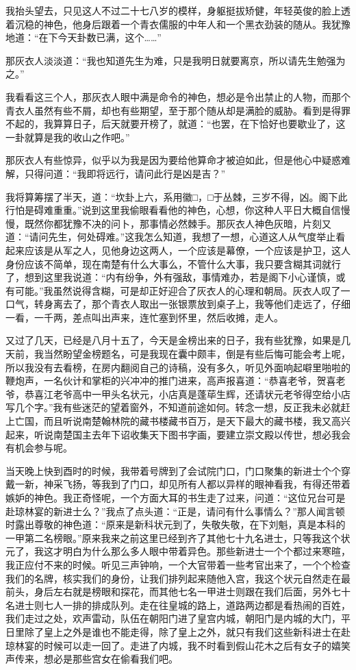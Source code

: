 我抬头望去，只见这人不过二十七八岁的模样，身躯挺拔矫健，年轻英俊的脸上透着沉稳的神色，他身后跟着一个青衣儒服的中年人和一个黑衣劲装的随从。我犹豫地道：“在下今天卦数已满，这个……”

那灰衣人淡淡道：“我也知道先生为难，只是我明日就要离京，所以请先生勉强为之。”

我看看这三个人，那灰衣人眼中满是命令的神色，想必是令出禁止的人物，而那个青衣人虽然有些不屑，却也有些期望，至于那个随从却是满脸的威胁。看到是得罪不起的，我算算日子，后天就要开榜了，就道：“也罢，在下恰好也要歇业了，这一卦就算是我的收山之作吧。”

那灰衣人有些惊异，似乎以为我是因为要给他算命才被迫如此，但是他心中疑惑难解，只得问道：“我即将远行，请问此行是凶是吉？”

我将算筹摆了半天，道：“坎卦上六，系用徽□，□于丛棘，三岁不得，凶。阁下此行怕是碍难重重。”说到这里我偷眼看看他的神色，心想，你这种人平日大概自信慢慢，既然你都犹豫不决的问卜，那事情必然棘手。那灰衣人神色灰暗，片刻又道：“请问先生，何处碍难。”这我怎么知道，我想了一想，心道这人从气度举止看起来应该是从军之人，见他身边这两人，一个应该是幕僚，一个应该是护卫，这人身份应该不简单，现在南楚有什么大事么，不管什么大事，我只要含糊其词就行了，想到这里我说道：“内有纷争，外有强敌，事情难办，若是阁下小心谨慎，或有可能。”我虽然说得含糊，可是却正好迎合了灰衣人的心理和朝局。灰衣人叹了一口气，转身离去了，那个青衣人取出一张银票放到桌子上，我等他们走远了，仔细一看，一千两，差点叫出声来，连忙塞到怀里，然后收摊，走人。

又过了几天，已经是八月十五了，今天是金榜出来的日子，我有些犹豫，如果是几天前，我当然盼望金榜题名，可是我现在囊中颇丰，倒是有些后悔可能会考上呢，所以我没有去看榜，在房内翻阅自己的诗稿，没有多久，听见外面响起噼里啪啦的鞭炮声，一名伙计和掌柜的兴冲冲的推门进来，高声报喜道：“恭喜老爷，贺喜老爷，恭喜江老爷高中一甲头名状元，小店真是蓬荜生辉，还请状元老爷得空给小店写几个字。”我有些迷茫的望着窗外，不知道前途如何。转念一想，反正我未必就赶上亡国，而且听说南楚翰林院的藏书楼藏书百万，是天下最大的藏书楼，我又高兴起来，听说南楚国主去年下诏收集天下图书字画，要建立崇文殿以传世，想必我会有机会参与呢。

当天晚上快到酉时的时候，我带着号牌到了会试院门口，门口聚集的新进士个个穿戴一新，神采飞扬，等我到了门口，却见所有人都以异样的眼神看我，有得还带着嫉妒的神色。我正奇怪呢，一个方面大耳的书生走了过来，问道：“这位兄台可是赴琼林宴的新进士么？”我点了点头道：“正是，请问有什么事情么？”那人闻言顿时露出尊敬的神色道：“原来是新科状元到了，失敬失敬，在下刘魁，真是本科的一甲第二名榜眼。”原来我来之前这里已经到齐了其他七十九名进士，只等我这个状元了，我这才明白为什么那么多人眼中带着异色。那些新进士一个个都过来寒暄，我正应付不来的时候。听见三声钟响，一个大官带着一些考官出来了，一个个检查我们的名牌，核实我们的身份，让我们排列起来随他入宫，我这个状元自然走在最前头，身后左右就是榜眼和探花，而其他七名一甲进士则跟在我们后面，另外七十名进士则七人一排的排成队列。走在往皇城的路上，道路两边都是看热闹的百姓，我们走过之处，欢声雷动，队伍在朝阳门进了皇宫内城，朝阳门是内城的大门，平日里除了皇上之外是谁也不能走得，除了皇上之外，就只有我们这些新科进士在赴琼林宴的时候可以走一回了。走进了内城，我不时看到假山花木之后有女子的嬉笑声传来，想必是那些宫女在偷看我们吧。

